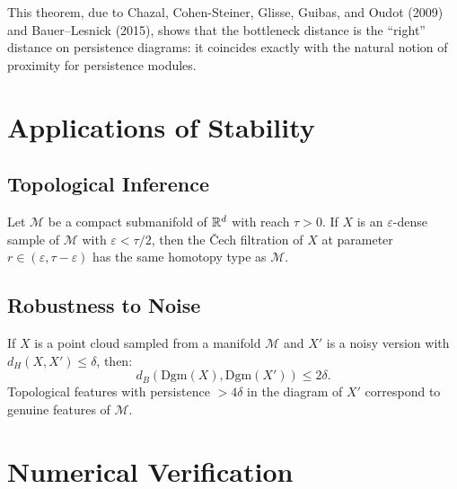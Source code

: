 \begin{remark}
This theorem, due to Chazal, Cohen-Steiner, Glisse, Guibas, and Oudot
(2009) and Bauer--Lesnick (2015), shows that the bottleneck distance is
the ``right'' distance on persistence diagrams: it coincides exactly
with the natural notion of proximity for persistence modules.
\end{remark}

\section{Applications of Stability}

\subsection{Topological Inference}

\begin{theorem}
Let $\mathcal{M}$ be a compact submanifold of $\mathbb{R}^d$ with reach
$\tau > 0$. If $X$ is an $\varepsilon$-dense sample of $\mathcal{M}$
with $\varepsilon < \tau / 2$, then the \v{C}ech filtration of $X$ at
parameter $r \in (\varepsilon, \tau - \varepsilon)$ has the same
homotopy type as $\mathcal{M}$.
\end{theorem}

\subsection{Robustness to Noise}

\begin{proposition}
If $X$ is a point cloud sampled from a manifold $\mathcal{M}$ and $X'$
is a noisy version with $d_H(X, X') \leq \delta$, then:
\[
  d_B(\mathrm{Dgm}(X), \mathrm{Dgm}(X')) \leq 2\delta.
\]
Topological features with persistence $> 4\delta$ in the diagram of
$X'$ correspond to genuine features of $\mathcal{M}$.
\end{proposition}

\section{Numerical Verification}

